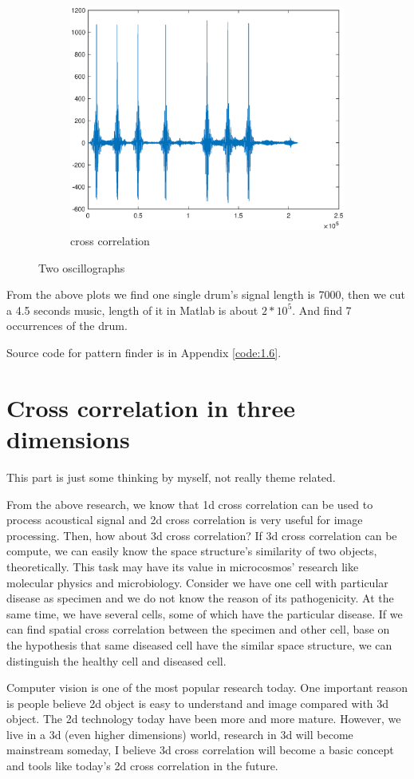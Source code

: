 \begin{figure}[h!]
\begin{subfigure}[t]{0.32\linewidth}
		\centering
		\includegraphics[width=1\linewidth]{figures/part1/crr_vis3.eps}
		\caption{cross correlation}
		\label{fig:crr_vis3}
	\end{subfigure}
	\caption{Two oscillographs}
	\label{fig:wave}
\end{figure} 

From the above plots we find one single drum's signal length is 7000, then we cut a 4.5 seconds music, length of it in Matlab is about $2*10^5$. And find 7 occurrences of the drum.

Source code for pattern finder is in Appendix \ref{code:1.6}.

\section{Cross correlation in three dimensions}

This part is just some thinking by myself, not really theme related. 

From the above research, we know that 1d cross correlation can be used to process acoustical signal and 2d cross correlation is very useful for image processing. Then, how about 3d cross correlation? If 3d cross correlation can be compute, we can easily know the space structure's similarity of two objects, theoretically. This task may have its value in microcosmos' research like molecular physics and microbiology. Consider we have one cell with particular disease as specimen and we do not know the reason of its pathogenicity. At the same time, we have several cells, some of which have the particular disease. If we can find spatial cross correlation between the specimen and other cell, base on the hypothesis that same diseased cell have the similar space structure, we can distinguish the healthy cell and diseased cell. 

Computer vision is one of the most popular research today. One important reason is people believe 2d object is easy to understand and image compared with 3d object. The 2d technology today have been more and more mature. However, we live in a 3d (even higher dimensions) world, research in 3d will become mainstream someday, I believe 3d cross correlation will become a basic concept and tools like today's 2d cross correlation in the future.